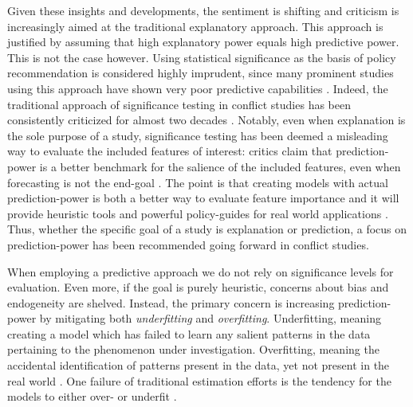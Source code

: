 \documentclass[a4paper]{article}
\begin{document}
Given these insights and developments, the sentiment is shifting and criticism is increasingly aimed at the traditional explanatory approach. This approach is justified by assuming that high explanatory power equals high predictive power. This is not the case however. Using statistical significance as the basis of policy recommendation is considered highly imprudent, since many prominent studies using this approach have shown very poor predictive capabilities \citep{Ward_Greenhill_Bakke_2010, Schrodt_2014, chadefaux2017conflict}. Indeed, the traditional approach of significance testing in conflict studies has been consistently criticized for almost two decades \citep{king_zeng_2001b, Ward_Greenhill_Bakke_2010, Goldstone_2010, Schrodt_2014, chadefaux2017conflict}. Notably, even when explanation is the sole purpose of a study, significance testing has been deemed a misleading way to evaluate the included features of interest: critics claim that prediction-power is a better benchmark for the salience of the included features, even when forecasting is not the end-goal \citep{Ward_Greenhill_Bakke_2010, Schrodt_2014}. The point is that creating models with actual prediction-power is both a better way to evaluate feature importance and it will provide heuristic tools and powerful policy-guides for real world applications \citep[372]{Ward_Greenhill_Bakke_2010}. Thus, whether the specific goal of a study is explanation or prediction, a focus on prediction-power has been recommended going forward in conflict studies.\par

When employing a predictive approach we do not rely on significance levels for evaluation. Even more, if the goal is purely heuristic, concerns about bias and endogeneity are shelved. Instead, the primary concern is increasing prediction-power by mitigating both \emph{underfitting} and \emph{overfitting}. Underfitting, meaning creating a model which has failed to learn any salient patterns in the data pertaining to the phenomenon under investigation. Overfitting, meaning the accidental identification of patterns present in the data, yet not present in the real world \citep[165-168]{Mcelreath_2018}. One failure of traditional estimation efforts is the tendency for the models to either over- or underfit \citep[364]{Ward_Greenhill_Bakke_2010}.\par 
\end{document}

